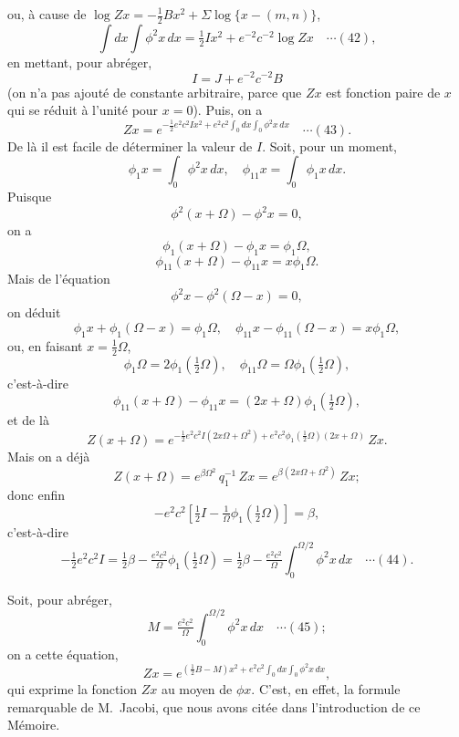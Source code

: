 \documentclass[12pt,a4paper]{article}
\begin{document}
ou, \`a cause de $\log Zx = -\tfrac12 Bx^2 + \Sigma\log\{x - (m,n)\}$,
\[
\int dx\int \phi^2 x\, dx = \tfrac12 Ix^2 + e^{-2}c^{-2}\log Zx \quad\cdots(42),
\]
en mettant, pour abr\'eger,
\[
I = J + e^{-2}c^{-2}B
\]
(on n'a pas ajout\'e de constante arbitraire, parce que $Zx$ est fonction paire de $x$ qui se r\'eduit \`a l'unit\'e pour $x = 0$). Puis, on a
\[
Zx = e^{-\tfrac12 e^2 c^2 I x^2 + e^2 c^2 \int_0 dx \int_0 \phi^2 x\, dx} \quad\cdots(43).
\]
De l\`a il est facile de d\'eterminer la valeur de $I$. Soit, pour un moment,
\[
\phi_1 x = \int_0 \phi^2 x\, dx,\quad \phi_{11} x = \int_0 \phi_1 x\, dx.
\]
Puisque
\[
\phi^2(x + \Omega) - \phi^2 x = 0,
\]
on a
\[
\phi_1(x + \Omega) - \phi_1 x = \phi_1\Omega,
\]
\[
\phi_{11}(x + \Omega) - \phi_{11} x = x\phi_1\Omega.
\]
Mais de l'\'equation
\[
\phi^2 x - \phi^2(\Omega - x) = 0,
\]
on d\'eduit
\[
\phi_1 x + \phi_1(\Omega - x) = \phi_1\Omega,\quad \phi_{11} x - \phi_{11}(\Omega - x) = x\phi_1\Omega,
\]
ou, en faisant $x = \tfrac12\Omega$,
\[
\phi_1\Omega = 2\phi_1(\tfrac12\Omega),\quad \phi_{11}\Omega = \Omega\phi_1(\tfrac12\Omega),
\]
c'est-\`a-dire
\[
\phi_{11}(x + \Omega) - \phi_{11} x = (2x + \Omega)\phi_1(\tfrac12\Omega),
\]
et de l\`a
\[
Z(x + \Omega) = e^{-\tfrac12 e^2 c^2 I(2x\Omega + \Omega^2) + e^2 c^2 \phi_1(\frac12\Omega)(2x + \Omega)}\, Zx.
\]
Mais on a d\'ej\`a
\[
Z(x + \Omega) = e^{\beta\Omega^2}\, q_1^{-1}\, Zx = e^{\beta(2x\Omega + \Omega^2)}\, Zx;
\]
donc enfin
\[
-e^2 c^2 \left[\tfrac12 I - \tfrac{1}{\Omega}\phi_1(\tfrac12\Omega)\right] = \beta,
\]
c'est-\`a-dire
\[
-\tfrac12 e^2 c^2 I = \tfrac12\beta - \tfrac{e^2 c^2}{\Omega}\phi_1(\tfrac12\Omega) = \tfrac12\beta - \tfrac{e^2 c^2}{\Omega}\int_0^{\Omega/2}\phi^2 x\, dx \quad\cdots(44).
\]

\newpage
\setcounter{page}{180}

Soit, pour abr\'eger,
\[
M = \tfrac{e^2 c^2}{\Omega}\int_0^{\Omega/2}\phi^2 x\, dx \quad\cdots(45);
\]
on a cette \'equation,
\[
Zx = e^{(\tfrac12 B - M)x^2 + e^2 c^2 \int_0 dx \int_0 \phi^2 x\, dx}, \tag*{(X)}
\]
qui exprime la fonction $Zx$ au moyen de $\phi x$. C'est, en effet, la formule remarquable de M.~Jacobi, que nous avons cit\'ee dans l'introduction de ce M\'emoire.
\end{document}
